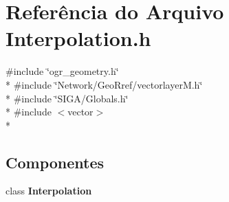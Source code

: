 \section{Referência do Arquivo Interpolation.\+h}
\label{_interpolation_8h}
{\ttfamily \#include \char`\"{}ogr\+\_\+geometry.\+h\char`\"{}}\\*
{\ttfamily \#include \char`\"{}Network/\+Geo\+Rref/vectorlayer\+M.\+h\char`\"{}}\\*
{\ttfamily \#include \char`\"{}S\+I\+G\+A/\+Globals.\+h\char`\"{}}\\*
{\ttfamily \#include $<$vector$>$}\\*
\subsection*{Componentes}
\begin{DoxyCompactItemize}
\item 
class {\bf Interpolation}
\end{DoxyCompactItemize}
